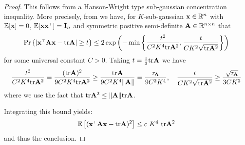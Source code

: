 \documentclass[../../thesis.tex]{subfiles}
\begin{document}
\begin{proof}
  This follows from a Hanson-Wright type \citep{rudelson2013hanson} sub-gaussian concentration inequality. More precisely,
  from \cite[Corollary 2.9]{zajkowski2018bounds} we have, for $K$-sub-gaussian $\mathbf x \in \mathbb R^n$ with $\mathbb E[\mathbf x] = 0$, $\E[\x \x^\top] = \I_n$ and symmetric positive semi-definite $\mathbf A \in \mathbb R^{n \times n}$ that
  \[
    \Pr \left\{ \left| \x^\top \A \x - \tr \A  \right| \ge t \right\} \le 2 \exp \left( - \min \left\{ \frac{t^2}{C^2 K^4 \tr\A^2 },  \frac{t}{C K^2 \sqrt{\tr\A^2}  } \right\} \right)
  \]
  for some universal constant $C > 0$. Taking $t = \frac13 \mathrm{tr} \mathbf A$ we have
  \[
    \frac{t^2}{C^2 K^4 \mathrm{tr}\mathbf A^2 } = \frac{ (\mathrm{tr} \mathbf A)^2 }{9 C^2 K^4 \mathrm{tr}\mathbf A^2 } \ge \frac{ \mathrm{tr} \mathbf A }{9 C^2 K^4 \| \mathbf A \| } = \frac{r_{\!\mathbf A}}{9 C^2 K^4}, \quad \frac{t}{C K^2 \sqrt{\mathrm{tr}\mathbf A^2}  } \ge \frac{\sqrt{r_{\!\mathbf A}}}{3 C K^2}
  \]
  where we use the fact that $\mathrm{tr} \mathbf A^2 \le \| \mathbf A \| \mathrm{tr} \mathbf A$.

  Integrating this bound yields:
  \[
    \E\left[ (\x^\top \A \x - \tr \A )^2 \right] \le c~K^4~\tr \A^2
  \]
  and thus the conclusion.
\end{proof}





\end{document}
